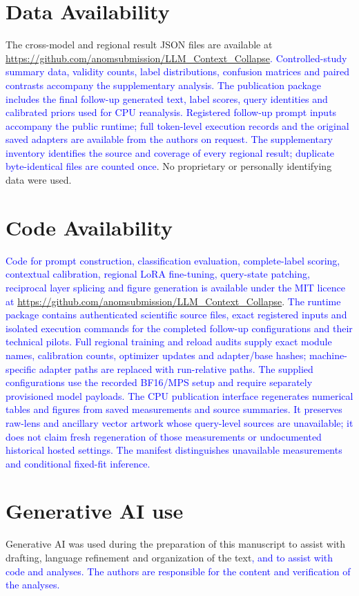 \documentclass[pdflatex, sn-nature]{sn-jnl}%
\theoremstyle{thmstyleone}%
\theoremstyle{thmstyletwo}%
\theoremstyle{thmstylethree}%
\begin{document}
\section*{Data Availability}
The cross-model and regional result JSON files are available at
\url{https://github.com/anomsubmission/LLM_Context_Collapse}\textcolor{blue}{. Controlled-study
summary data, validity counts, label distributions, confusion matrices and paired
contrasts accompany the supplementary analysis. The publication package includes the final follow-up generated text, label scores, query identities and calibrated priors used for CPU reanalysis. Registered follow-up prompt inputs accompany the public runtime; full token-level execution records and the original saved adapters are available from the authors on request. The
supplementary inventory identifies the source and coverage of every regional
result; duplicate byte-identical files are counted once}. No proprietary or
personally identifying data were used.

\section*{Code Availability}
\textcolor{blue}{Code for prompt construction, classification evaluation, complete-label scoring,
contextual calibration, regional LoRA fine-tuning, query-state patching, reciprocal
layer splicing and figure generation is available under the MIT licence at}
\url{https://github.com/anomsubmission/LLM_Context_Collapse}. \textcolor{blue}{The runtime package contains authenticated scientific source files, exact registered inputs and isolated execution commands for the completed follow-up configurations and their technical pilots. Full regional training and reload audits supply exact module names, calibration counts, optimizer updates and adapter/base hashes; machine-specific adapter paths are replaced with run-relative paths. The supplied configurations use the recorded BF16/MPS setup and require separately provisioned model payloads. The CPU publication interface regenerates numerical tables and figures from saved measurements and source summaries. It preserves raw-lens and ancillary vector artwork whose query-level sources are unavailable; it does not claim fresh regeneration of those measurements or undocumented historical hosted settings. The manifest distinguishes unavailable measurements and conditional fixed-fit inference.}

\section*{Generative AI use}
Generative AI was used during the preparation of this manuscript to assist with
drafting, language refinement and organization of the text\textcolor{blue}{, and to assist with code and analyses. The authors are responsible for the content and verification of the analyses.}
\end{document}
